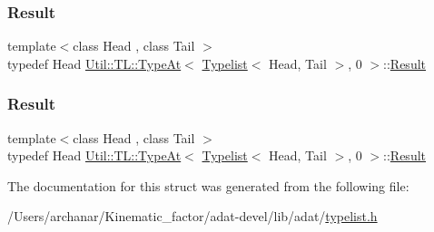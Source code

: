 \mbox{\label{structUtil_1_1TL_1_1TypeAt_3_01Typelist_3_01Head_00_01Tail_01_4_00_010_01_4_a3e1d7aaa0069c4e96cbb6bbc823fa9e8}} 
\subsubsection{\texorpdfstring{Result}{Result}\hspace{0.1cm}{\footnotesize\ttfamily [2/3]}}
{\footnotesize\ttfamily template$<$class Head , class Tail $>$ \\
typedef Head \mbox{\hyperlink{structUtil_1_1TL_1_1TypeAt}{Util\+::\+T\+L\+::\+Type\+At}}$<$ \mbox{\hyperlink{structUtil_1_1Typelist}{Typelist}}$<$ Head, Tail $>$, 0 $>$\+::\mbox{\hyperlink{structUtil_1_1TL_1_1TypeAt_3_01Typelist_3_01Head_00_01Tail_01_4_00_010_01_4_a3e1d7aaa0069c4e96cbb6bbc823fa9e8}{Result}}}

\mbox{\label{structUtil_1_1TL_1_1TypeAt_3_01Typelist_3_01Head_00_01Tail_01_4_00_010_01_4_a3e1d7aaa0069c4e96cbb6bbc823fa9e8}} 
\subsubsection{\texorpdfstring{Result}{Result}\hspace{0.1cm}{\footnotesize\ttfamily [3/3]}}
{\footnotesize\ttfamily template$<$class Head , class Tail $>$ \\
typedef Head \mbox{\hyperlink{structUtil_1_1TL_1_1TypeAt}{Util\+::\+T\+L\+::\+Type\+At}}$<$ \mbox{\hyperlink{structUtil_1_1Typelist}{Typelist}}$<$ Head, Tail $>$, 0 $>$\+::\mbox{\hyperlink{structUtil_1_1TL_1_1TypeAt_3_01Typelist_3_01Head_00_01Tail_01_4_00_010_01_4_a3e1d7aaa0069c4e96cbb6bbc823fa9e8}{Result}}}



The documentation for this struct was generated from the following file\+:\begin{DoxyCompactItemize}
\item 
/\+Users/archanar/\+Kinematic\+\_\+factor/adat-\/devel/lib/adat/\mbox{\hyperlink{adat-devel_2lib_2adat_2typelist_8h}{typelist.\+h}}\end{DoxyCompactItemize}

